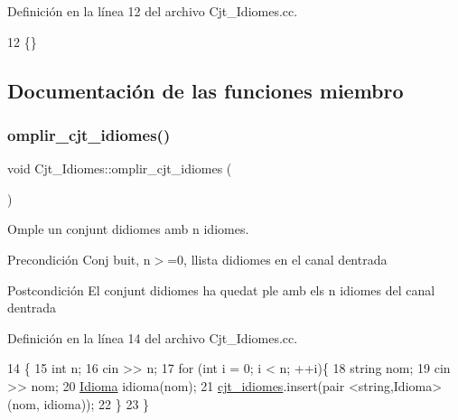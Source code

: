 Definición en la línea 12 del archivo Cjt\+\_\+\+Idiomes.\+cc.


\begin{DoxyCode}
12 \{\}
\end{DoxyCode}


\subsection{Documentación de las funciones miembro}
\mbox{\label{class_cjt___idiomes_a27ad0dd99449fffa904e6a757b4388ad}} 
\subsubsection{\texorpdfstring{omplir\+\_\+cjt\+\_\+idiomes()}{omplir\_cjt\_idiomes()}}
{\footnotesize\ttfamily void Cjt\+\_\+\+Idiomes\+::omplir\+\_\+cjt\+\_\+idiomes (\begin{DoxyParamCaption}{ }\end{DoxyParamCaption})}



Omple un conjunt d\textquotesingle{}idiomes amb n idiomes. 

\begin{DoxyPrecond}{Precondición}
Conj buit, n$>$=0, llista d\textquotesingle{}idiomes en el canal d\textquotesingle{}entrada 
\end{DoxyPrecond}
\begin{DoxyPostcond}{Postcondición}
El conjunt d\textquotesingle{}idiomes ha quedat ple amb els n idiomes del canal d\textquotesingle{}entrada 
\end{DoxyPostcond}


Definición en la línea 14 del archivo Cjt\+\_\+\+Idiomes.\+cc.


\begin{DoxyCode}
14                                     \{
15     \textcolor{keywordtype}{int} n;
16     cin >> n;
17     \textcolor{keywordflow}{for} (\textcolor{keywordtype}{int} i = 0; i < n; ++i)\{
18         \textcolor{keywordtype}{string} nom;
19         cin >> nom;
20         \hyperlink{class_idioma}{Idioma} idioma(nom);
21         \hyperlink{class_cjt___idiomes_a1d294e628332477cbb3334cd8fb490a4}{cjt\_idiomes}.insert(pair <string,Idioma> (nom, idioma));
22     \}
23 \}
\end{DoxyCode}
\mbox{\label{class_cjt___idiomes_a9e75f643c62886df635403bd3108c1df}} 
